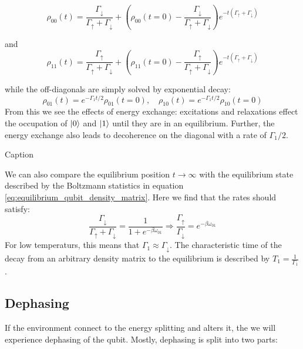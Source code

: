 \begin{equation}
\rho_{00}(t) = \frac{\Gamma_\downarrow}{\Gamma_\uparrow + \Gamma_\downarrow} + \left(\rho_{00}(t=0) -  \frac{\Gamma_\downarrow}{\Gamma_\uparrow + \Gamma_\downarrow}\right)e^{-t(\Gamma_\uparrow + \Gamma_\downarrow)}
\end{equation}

and 
\begin{equation}    
\rho_{11}(t) = \frac{\Gamma_\uparrow}{\Gamma_\uparrow + \Gamma_\downarrow}+\left( \rho_{11}(t=0) -\frac{ \Gamma_\uparrow}{\Gamma_\uparrow + \Gamma_\downarrow}\right) e^{-t(\Gamma_\uparrow + \Gamma_\downarrow)}
\end{equation}

while the off-diagonals are simply solved by exponential decay:
\begin{equation}
    \rho_{01}(t) = e^{-\Gamma_1 t/2}\rho_{01}(t=0), \quad \rho_{10}(t) = e^{-\Gamma_1 t/2}\rho_{10}(t=0)
\end{equation}
From this we see the effects of energy exchange: excitations and relaxations effect the occupation of $\ket{0}$ and $\ket{1}$ until they are in an equilibrium. Further, the energy exchange also leads to decoherence on the diagonal with a rate of $\Gamma_1/2$. 

\begin{marginfigure}
    \centering
    \caption{Caption}
    \label{fig:enter-label}
\end{marginfigure}


We can also compare the equilibrium position $t\to\infty$ with the equilibrium state described by the Boltzmann statistics in equation \ref{eq:equilibrium_qubit_density_matrix}. Here we find that the rates should satisfy:
\begin{equation}
    \frac{\Gamma_\downarrow}{\Gamma_\uparrow + \Gamma_\downarrow} = \frac{1}{1 + e^{-\beta\omega_{01}}} \Rightarrow \frac{\Gamma_\uparrow}{\Gamma_\downarrow} =e^{-\beta\omega_{01}} 
\end{equation}
For low temperaturs, this means that $\Gamma_1 \approx \Gamma_\downarrow$. The characteristic time of the decay from an arbitrary density matrix to the equilibrium is described by $T_1 = \frac{1}{\Gamma_1}$.

\subsection{Dephasing}
If the environment connect to the energy splitting and alters it, the we will experience dephasing of the qubit. Mostly, dephasing is split into two parts: 

